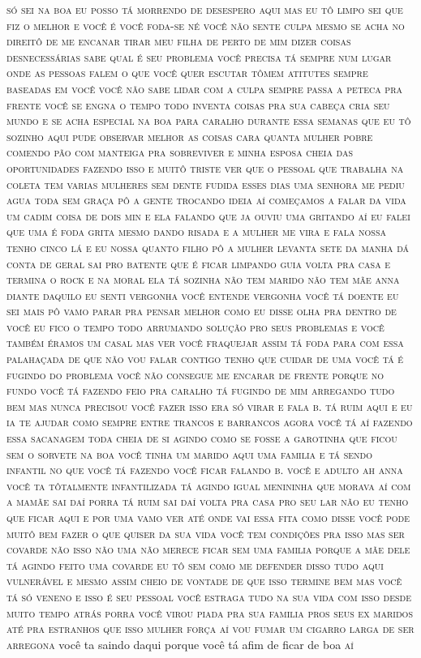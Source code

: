 \textsc{só sei na boa eu posso tá morrendo de desespero aqui mas eu tô limpo sei
que fiz o melhor e você é você foda-se né você não sente culpa mesmo se
acha no direitô de me encanar tirar meu filha de perto de mim dizer
coisas desnecessárias sabe qual é seu problema você precisa tá sempre
num lugar onde as pessoas falem o que você quer escutar tômem atitutes
sempre baseadas em você você não sabe lidar com a culpa sempre passa a
peteca pra frente você se engna o tempo todo inventa coisas pra sua
cabeça cria seu mundo e se acha especial na boa para caralho durante
essa semanas que eu tô sozinho aqui pude observar melhor as coisas cara
quanta mulher pobre comendo pão com manteiga pra sobreviver e minha
esposa cheia das oportunidades fazendo isso e muitô triste ver que o
pessoal que trabalha na coleta tem varias mulheres sem dente fudida
esses dias uma senhora me pediu agua toda sem graça pô a gente trocando
ideia aí começamos a falar da vida um cadim coisa de dois min e ela
falando que ja ouviu uma gritando aí eu falei que uma é foda grita mesmo
dando risada e a mulher me vira e fala nossa tenho cinco lá e eu nossa
quanto filho pô a mulher levanta sete da manha dá conta de geral sai pro
batente que é ficar limpando guia volta pra casa e termina o rock e na
moral ela tá sozinha não tem marido não tem mãe anna diante daquilo eu
senti vergonha você entende vergonha você tá doente eu sei mais pô vamo
parar pra pensar melhor como eu disse olha pra dentro de você eu fico o
tempo todo arrumando solução pro seus problemas e você também éramos um
casal mas ver você fraquejar assim tá foda para com essa palahaçada de
que não vou falar contigo tenho que cuidar de uma você tá é fugindo do
problema você não consegue me encarar de frente porque no fundo você tá
fazendo feio pra caralho tá fugindo de mim arregando tudo bem mas nunca
precisou você fazer isso era só virar e fala b. tá ruim aqui e eu ia te
ajudar como sempre entre trancos e barrancos agora você tá aí fazendo
essa sacanagem toda cheia de si agindo como se fosse a garotinha que
ficou sem o sorvete na boa você tinha um marido aqui uma familia e tá
sendo infantil no que você tá fazendo você ficar falando b. você e
adulto ah anna você ta tôtalmente infantilizada tá agindo igual
menininha que morava aí com a mamãe sai daí porra tá ruim sai daí volta
pra casa pro seu lar não eu tenho que ficar aqui e por uma vamo ver até
onde vai essa fita como disse você pode muitô bem fazer o que quiser da
sua vida você tem condições pra isso mas ser covarde não isso não uma
não merece ficar sem uma familia porque a mãe dele tá agindo feito uma
covarde eu tô sem como me defender disso tudo aqui vulnerável e mesmo
assim cheio de vontade de que isso termine bem mas você tá só veneno e
isso é seu pessoal você estraga tudo na sua vida com isso desde muito
tempo atrás porra você virou piada pra sua familia pros seus ex maridos
até pra estranhos que isso mulher força aí vou fumar um cigarro larga de
ser arregona} você ta saindo daqui porque você tá afim de ficar de boa \textsc{aí}
